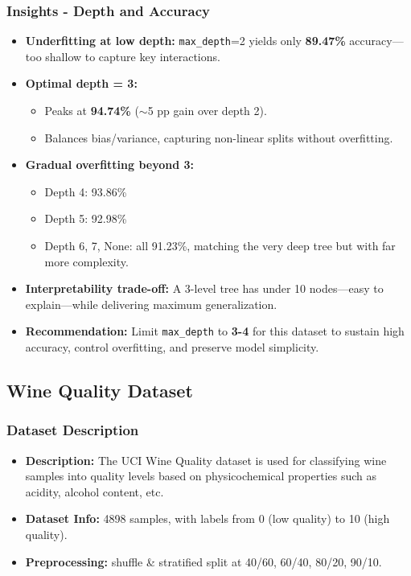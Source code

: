 \subsubsection*{Insights - Depth and Accuracy}
\begin{itemize}
	\item \textbf{Underfitting at low depth:}
	      \texttt{max\_depth}=2 yields only \textbf{89.47\%} accuracy—too shallow to capture key interactions.
	\item \textbf{Optimal depth = 3:}
	      \begin{itemize}
		      \item Peaks at \textbf{94.74\%} ($\sim$5 pp gain over depth 2).
		      \item Balances bias/variance, capturing non-linear splits without overfitting.
	      \end{itemize}
	\item \textbf{Gradual overfitting beyond 3:}
	      \begin{itemize}
		      \item Depth 4: 93.86\%
		      \item Depth 5: 92.98\%
		      \item Depth 6, 7, None: all 91.23\%, matching the very deep tree but with far more complexity.
	      \end{itemize}
	\item \textbf{Interpretability trade-off:}
	      A 3-level tree has under 10 nodes—easy to explain—while delivering maximum generalization.
	\item \textbf{Recommendation:}
	      Limit \texttt{max\_depth} to \textbf{3-4} for this dataset to sustain high accuracy, control overfitting, and preserve model simplicity.
\end{itemize}

\clearpage
\subsection{Wine Quality Dataset}
\subsubsection*{Dataset Description}
\begin{itemize}
	\item \textbf{Description:} The UCI Wine Quality dataset is used for classifying wine samples into quality levels based on physicochemical properties such as acidity, alcohol content, etc.
	\item \textbf{Dataset Info:} 4898 samples, with labels from 0 (low quality) to 10 (high quality).
	\item \textbf{Preprocessing:} shuffle \& stratified split at 40/60, 60/40, 80/20, 90/10.
\end{itemize}

